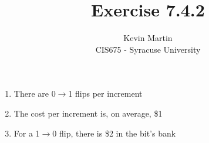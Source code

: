 \documentclass{article}
\author{Kevin Martin\\ CIS675 - Syracuse University}
\title{Exercise 7.4.2}
\begin{document}
\maketitle
\begin{enumerate}
  \item There are   0$\to$1 flips per increment
  \item The cost per increment is, on average, \$1
  \item For a 1$\to$0 flip, there is \$2 in the bit's bank
\end{enumerate}
\end{document}
